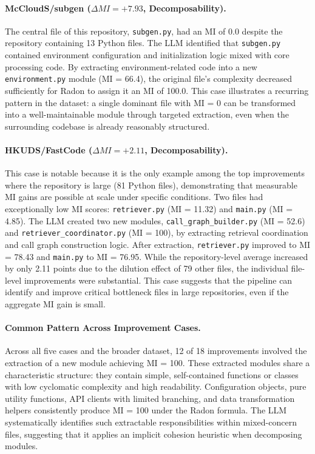 \documentclass[sigconf,review,anonymous]{acmart}
\begin{document}
\paragraph{McCloudS/subgen ($\Delta MI = +7.93$, Decomposability).}
The central file of this repository, \texttt{subgen.py}, had an MI of 0.0 despite the repository containing 13 Python files. The LLM identified that \texttt{subgen.py} contained environment configuration and initialization logic mixed with core processing code. By extracting environment-related code into a new \texttt{environment.py} module (MI = 66.4), the original file's complexity decreased sufficiently for Radon to assign it an MI of 100.0. This case illustrates a recurring pattern in the dataset: a single dominant file with MI = 0 can be transformed into a well-maintainable module through targeted extraction, even when the surrounding codebase is already reasonably structured.

\paragraph{HKUDS/FastCode ($\Delta MI = +2.11$, Decomposability).}
This case is notable because it is the only example among the top improvements where the repository is large (81 Python files), demonstrating that measurable MI gains are possible at scale under specific conditions. Two files had exceptionally low MI scores: \texttt{retriever.py} (MI = 11.32) and \texttt{main.py} (MI = 4.85). The LLM created two new modules, \texttt{call\_graph\_builder.py} (MI = 52.6) and \texttt{retriever\_coordinator.py} (MI = 100), by extracting retrieval coordination and call graph construction logic. After extraction, \texttt{retriever.py} improved to MI = 78.43 and \texttt{main.py} to MI = 76.95. While the repository-level average increased by only 2.11 points due to the dilution effect of 79 other files, the individual file-level improvements were substantial. This case suggests that the pipeline can identify and improve critical bottleneck files in large repositories, even if the aggregate MI gain is small.

\paragraph{Common Pattern Across Improvement Cases.}
Across all five cases and the broader dataset, 12 of 18 improvements involved the extraction of a new module achieving MI = 100. These extracted modules share a characteristic structure: they contain simple, self-contained functions or classes with low cyclomatic complexity and high readability. Configuration objects, pure utility functions, API clients with limited branching, and data transformation helpers consistently produce MI = 100 under the Radon formula. The LLM systematically identifies such extractable responsibilities within mixed-concern files, suggesting that it applies an implicit cohesion heuristic when decomposing modules.
\end{document}
